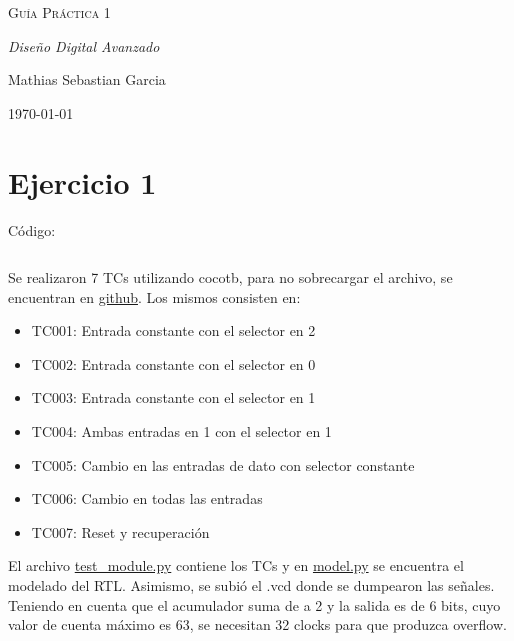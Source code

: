 \documentclass{article}
\begin{document}
    \begin{titlepage}
        \centering
        \vspace{4cm}
        {\scshape\Huge Guía Práctica 1 \par}
        \vspace{3cm}
        {\itshape\Large Diseño Digital Avanzado \par}
        \vfill
        {\Large Mathias Sebastian Garcia\par}
        \vfill
        {\Large \today\par}
    \end{titlepage}

    \tableofcontents

    \newpage
    \section{Ejercicio 1}
    Código:
    \inputminted[fontsize=\scriptsize]{systemverilog}{../sum_accumulator/rtl/sum_accumulator.sv}

    Se realizaron 7 TCs utilizando cocotb, para no sobrecargar el archivo, se encuentran en \href{https://github.com/msebgarcia/DDA2024/tree/main/GP01/sum_accumulator/tb}{github}. Los mismos consisten en:
    \begin{itemize}
        \item TC001: Entrada constante con el selector en 2
        \item TC002: Entrada constante con el selector en 0
        \item TC003: Entrada constante con el selector en 1
        \item TC004: Ambas entradas en 1 con el selector en 1
        \item TC005: Cambio en las entradas de dato con selector constante
        \item TC006: Cambio en todas las entradas
        \item TC007: Reset y recuperación
    \end{itemize}
    El archivo \href{https://github.com/msebgarcia/DDA2024/blob/main/GP01/sum_accumulator/tb/test_module.py}{test\_module.py} contiene los TCs y en \href{https://github.com/msebgarcia/DDA2024/blob/main/GP01/sum_accumulator/tb/model.py}{model.py} se encuentra el modelado del RTL. Asimismo, se subió el .vcd donde se dumpearon las señales.
    \\
    Teniendo en cuenta que el acumulador suma de a 2 y la salida es de 6 bits, cuyo valor de cuenta máximo es 63, se necesitan 32 clocks para que produzca overflow.
\end{document}
